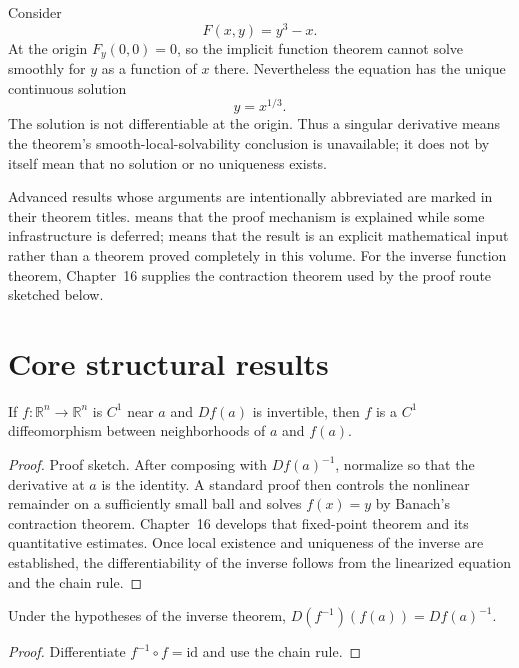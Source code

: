 \begin{example}\label{ex:ii09-expand-03}
Consider
\[
F(x,y)=y^3-x.
\]
At the origin \(F_y(0,0)=0\), so the implicit function theorem cannot solve
smoothly for \(y\) as a function of \(x\) there. Nevertheless the equation has
the unique continuous solution
\[
y=x^{1/3}.
\]
The solution is not differentiable at the origin. Thus a singular derivative
means the theorem's smooth-local-solvability conclusion is unavailable; it
does not by itself mean that no solution or no uniqueness exists.
\end{example}
\begin{remark}
Advanced results whose arguments are intentionally abbreviated are marked in their theorem titles.  means that the proof mechanism is explained while some infrastructure is deferred;  means that the result is an explicit mathematical input rather than a theorem proved completely in this volume. For the inverse function theorem, Chapter~16 supplies the contraction theorem used by the proof route sketched below.
\end{remark}

\section{Core structural results}

\begin{theorem}\label{thm:ii09-01}
If $f:\mathbb R^n\to\mathbb R^n$ is $C^1$ near $a$ and $Df(a)$ is invertible, then $f$ is a $C^1$ diffeomorphism between neighborhoods of $a$ and $f(a)$.
\begin{proof}
Proof sketch. After composing with $Df(a)^{-1}$, normalize so that the derivative at $a$ is the identity. A standard proof then controls the nonlinear remainder on a sufficiently small ball and solves $f(x)=y$ by Banach's contraction theorem. Chapter~16 develops that fixed-point theorem and its quantitative estimates. Once local existence and uniqueness of the inverse are established, the differentiability of the inverse follows from the linearized equation and the chain rule.
\end{proof}
\end{theorem}

\begin{theorem}\label{thm:ii09-02}
Under the hypotheses of the inverse theorem, $D(f^{-1})(f(a))=Df(a)^{-1}$.
\begin{proof}
Differentiate $f^{-1}\circ f=\mathrm{id}$ and use the chain rule.
\end{proof}
\end{theorem}

